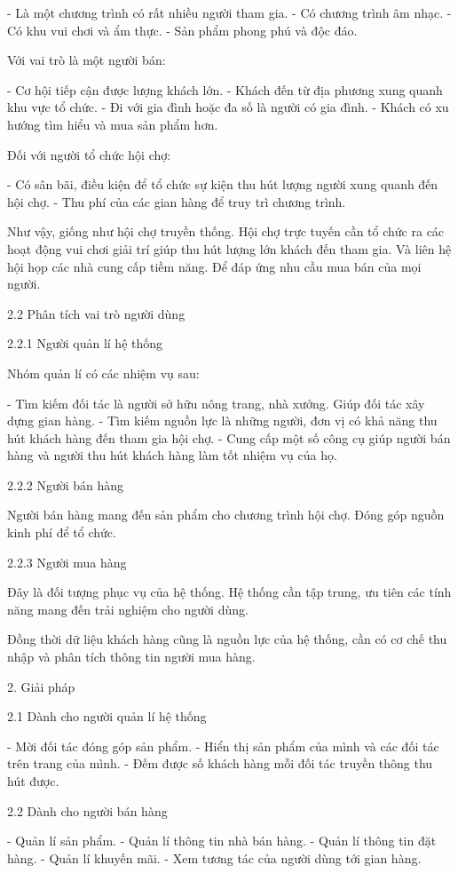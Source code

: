 \documentclass{report}
\begin{document}
- Là một chương trình có rất nhiều người tham gia.
- Có chương trình âm nhạc.
- Có khu vui chơi và ẩm thực.
- Sản phẩm phong phú và độc đáo.

Với vai trò là một người bán:

- Cơ hội tiếp cận được lượng khách lớn.
- Khách đến từ địa phương xung quanh khu vực tổ chức.
- Đi với gia đình hoặc đa số là người có gia đình.
- Khách có xu hướng tìm hiểu và mua sản phẩm hơn.

Đối với người tổ chức hội chợ:

- Có sân bãi, điều kiện để tổ chức sự kiện thu hút lượng người xung quanh đến hội chợ.
- Thu phí của các gian hàng để truy trì chương trình.

Như vậy, giống như hội chợ truyền thống. Hội chợ trực tuyến cần tổ chức ra các hoạt động vui chơi giải trí giúp thu hút
lượng lớn khách đến tham gia. Và liên hệ hội họp các nhà cung cấp tiềm năng. Để đáp ứng nhu cầu mua bán của mọi người.

2.2 Phân tích vai trò người dùng

2.2.1 Người quản lí hệ thống

Nhóm quản lí có các nhiệm vụ sau:

- Tìm kiếm đối tác là người sở hữu nông trang, nhà xưởng. Giúp đối tác xây dựng gian hàng.
- Tìm kiếm nguồn lực là những người, đơn vị có khả năng thu hút khách hàng đến tham gia hội chợ.
- Cung cấp một số công cụ giúp người bán hàng và người thu hút khách hàng làm tốt nhiệm vụ của họ.

2.2.2 Người bán hàng

Người bán hàng mang đến sản phẩm cho chương trình hội chợ. Đóng góp nguồn kinh phí để tổ chức.

2.2.3 Người mua hàng

Đây là đối tượng phục vụ của hệ thống. Hệ thống cần tập trung, ưu tiên các tính năng mang đến trải nghiệm cho người
dùng.

Đồng thời dữ liệu khách hàng cũng là nguồn lực của hệ thống, cần có cơ chế thu nhập và phân tích thông tin người mua
hàng.

2. Giải pháp

2.1 Dành cho người quản lí hệ thống

- Mời đối tác đóng góp sản phẩm.
- Hiển thị sản phẩm của mình và các đối tác trên trang của mình.
- Đếm được số khách hàng mỗi đối tác truyền thông thu hút được.

2.2 Dành cho người bán hàng

- Quản lí sản phẩm.
- Quản lí thông tin nhà bán hàng.
- Quản lí thông tin đặt hàng.
- Quản lí khuyến mãi.
- Xem tương tác của người dùng tới gian hàng.
\end{document}
